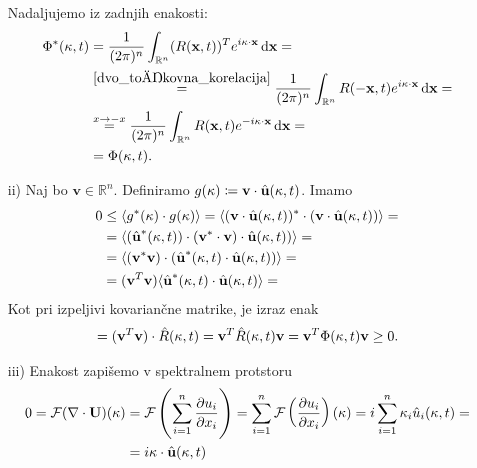 \documentclass[mat2, tisk]{fmfdelo}
\newcommand{\R}{\mathbb R}
\newcommand{\bd}{\textbf}
\begin{document}
\begin{dokaz}
\begin{enumerate}
  Nadaljujemo iz zadnjih enakosti: 
  \begin{align*}
  \Phi^*(\text{\bd{$\kappa$}}, t) &= \frac{1}{(2\pi)^n} \int_{\R^n} ({R}(\bd{x}, t))^T e^{i\text{\bd{$\kappa$}} \cdot \bd{x}}\dif \bd{x} = \\
  &\stackrel{\ref{dvo_točkovna_korelacija}}{=} \frac{1}{(2\pi)^n} \int_{\R^n} {R}(-\bd{x}, t) e^{i\text{\bd{$\kappa$}} \cdot \bd{x}}\dif \bd{x} = \\
  &\stackrel{x\rightarrow -x}{=} \frac{1}{(2\pi)^n} \int_{\R^n} {R}(\bd{x}, t) e^{-i\text{\bd{$\kappa$}} \cdot \bd{x}}\dif \bd{x} = \\
  &= \Phi(\text{\bd{$\kappa$}}, t).
\end{align*}
\item[ii)] Naj bo $\bd{v} \in \R^n$. Definiramo $g(\text{\bd{$\kappa$}}) \coloneqq \bd{v} \cdot \hat{\bd{u}}(\text{\bd{$\kappa$}}, t)$.
Imamo 
\begin{align*} 
0 &\leq \langle g^*(\text{\bd{$\kappa$}}) \cdot g(\text{\bd{$\kappa$}}) \rangle = \langle (\bd{v} \cdot \hat{\bd{u}}(\text{\bd{$\kappa$}}, t))^* \cdot (\bd{v} \cdot \hat{\bd{u}}(\text{\bd{$\kappa$}}, t)) \rangle = \\
&= \langle (\hat{\bd{u}}^*(\text{\bd{$\kappa$}}, t))\cdot (\bd{v}^*\cdot \bd{v}) \cdot \hat{\bd{u}}(\text{\bd{$\kappa$}}, t)) \rangle = \\
&= \langle (\bd{v}^* \bd{v}) \cdot (\hat{\bd{u}}^*(\text{\bd{$\kappa$}}, t) \cdot \hat{\bd{u}}(\text{\bd{$\kappa$}}, t)) \rangle = \\
&= (\bd{v}^T \bd{v}) \langle \hat{\bd{u}}^*(\text{\bd{$\kappa$}}, t) \cdot \hat{\bd{u}}(\text{\bd{$\kappa$}}, t) \rangle =
\end{align*}
Kot pri izpeljivi kovariančne matrike, je izraz enak 
\begin{align*}
= (\bd{v}^T \bd{v}) \cdot \hat{R}(\text{\bd{$\kappa$}}, t) = \bd{v}^T \hat{R}(\text{\bd{$\kappa$}}, t) \bd{v} = \bd{v}^T \Phi(\text{\bd{$\kappa$}}, t) \bd{v} \geq 0.
\end{align*}
\item[iii)] Enakost zapišemo v spektralnem protstoru
\begin{align*}
  0 = \mathcal{F}(\nabla \cdot \bd{U})(\text{\bd{$\kappa$}}) &= \mathcal{F}\left(\sum_{i=1}^{n} \frac{\partial u_i}{\partial x_i} \right) = \sum_{i=1}^{n} \mathcal{F}\left(\frac{\partial u_i}{\partial x_i} \right)(\text{\bd{$\kappa$}}) = i\sum_{i=1}^{n} \text{\bd{$\kappa$}}_i \hat{u}_i(\text{\bd{$\kappa$}}, t) = \\
  &= i \text{\bd{$\kappa$}} \cdot \hat{\bd{u}}(\text{\bd{$\kappa$}}, t)

\end{align*}
\end{enumerate}
\end{dokaz}
\end{document}
